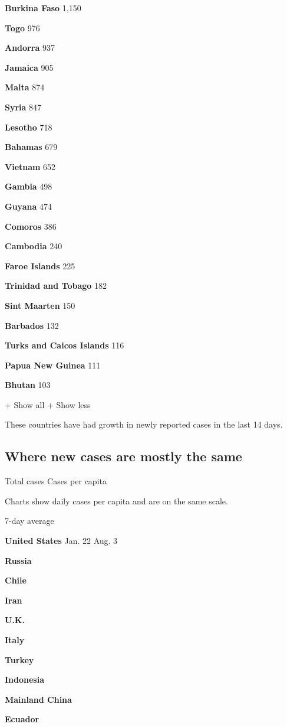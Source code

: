 \textbf{Burkina Faso} 1,150

\textbf{Togo} 976

\textbf{Andorra} 937

\textbf{Jamaica} 905

\textbf{Malta} 874

\textbf{Syria} 847

\textbf{Lesotho} 718

\textbf{Bahamas} 679

\textbf{Vietnam} 652

\textbf{Gambia} 498

\textbf{Guyana} 474

\textbf{Comoros} 386

\textbf{Cambodia} 240

\textbf{Faroe Islands} 225

\textbf{Trinidad and Tobago} 182

\textbf{Sint Maarten} 150

\textbf{Barbados} 132

\textbf{Turks and Caicos Islands} 116

\textbf{Papua New Guinea} 111

\textbf{Bhutan} 103

+ Show all + Show less

These countries have had growth in newly reported cases in the last 14
days.

\hypertarget{where-new-cases-are-mostly-the-same}{%
\subsection{Where new cases are mostly the
same}\label{where-new-cases-are-mostly-the-same}}

Total cases Cases per capita

Charts show daily cases per capita and are on the same scale.

7-day average

\textbf{United States} Jan. 22 Aug. 3

\textbf{Russia}

\textbf{Chile}

\textbf{Iran}

\textbf{U.K.}

\textbf{Italy}

\textbf{Turkey}

\textbf{Indonesia}

\textbf{Mainland China}

\textbf{Ecuador}

